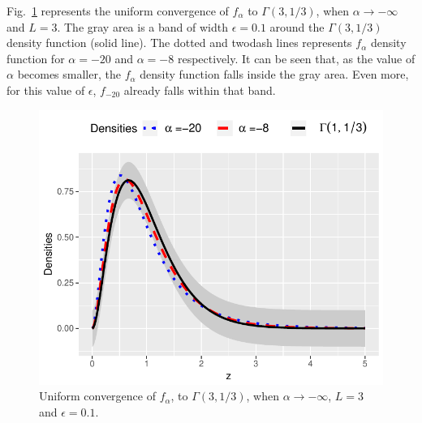 \documentclass[journal]{IEEEtran}
\numberwithin{equation}{section}
\begin{document}
\vspace{0.2cm}
Fig.~\ref{ConvInfinito} represents the uniform convergence of $f_{\alpha}$ to $\Gamma(3,1/3)$, when $\alpha \to -\infty$ and $L=3$. The gray area is a band of width $\epsilon=0.1$ around the $\Gamma(3,1/3)$ density function (solid line). The dotted and twodash lines represents $f_{\alpha}$ density function for $\alpha=-20$ and $\alpha=-8$ respectively. It can be seen that, as the value of $\alpha$ becomes smaller, the $f_{\alpha}$ density function falls inside the gray area. Even more, for this value of $\epsilon$, $f_{-20}$ already falls within that band.
\begin{figure}[hbt]
	\centering    
	\includegraphics[scale=0.5]{../../../Figures/DTTeorico/ConvUniformeMenosInfinito.pdf}
	\caption{\label{ConvInfinito}Uniform convergence of $f_{\alpha}$, to $\Gamma(3,1/3)$, when $\alpha \to -\infty$, $L=3$ and $\epsilon=0.1$.}
\end{figure} 
\end{document}
